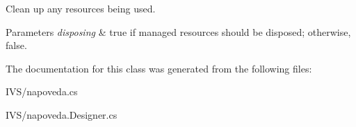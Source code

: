 Clean up any resources being used. 


\begin{DoxyParams}{Parameters}
{\em disposing} & true if managed resources should be disposed; otherwise, false.\\
\hline
\end{DoxyParams}


The documentation for this class was generated from the following files\+:\begin{DoxyCompactItemize}
\item 
I\+V\+S/napoveda.\+cs\item 
I\+V\+S/napoveda.\+Designer.\+cs\end{DoxyCompactItemize}
